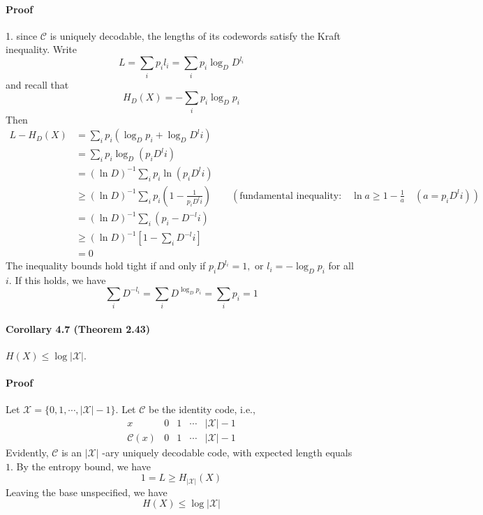 \documentclass[8pt]{article}
\begin{document}
\paragraph{Proof}
1. since $\mathcal{C}$ is uniquely decodable, the lengths of its codewords satisfy the Kraft inequality. Write
$$
L=\sum_{i} p_{i} l_{i}=\sum_{i} p_{i} \log _{D} D^{l_{i}}
$$
and recall that
$$
H_{D}(X)=-\sum_{i} p_{i} \log _{D} p_{i}
$$
Then 
$$
\begin{aligned}
L-H_{D}(X) &=\sum_{i} p_{i}\left(\log _{D} p_{i}+\log _{D} D^{l} i\right) \\
&=\sum_{i} p_{i} \log _{D}\left(p_{i} D^{l} i\right) \\
&=(\ln D)^{-1} \sum_{i} p_{i} \ln \left(p_{i} D^{l} i\right) \\
& \geq(\ln D)^{-1} \sum_{i} p_{i}\left(1-\frac{1}{p_{i} D^{l} i}\right) \qquad (\text{fundamental inequality:}  \quad \ln a \geq 1-\frac{1}{a} \quad\left(a=p_{i} D^{l} i\right))\\
&=(\ln D)^{-1} \sum_{i}\left(p_{i}-D^{-l} i\right) \\
&\geq(\ln D)^{-1}\left[1-\sum_{i} D^{-l} i\right] \\
&=0
\end{aligned}
$$
The inequality bounds hold tight if and only if $p_{i} D^{l_{i}}=1, \text { or } l_{i}=-\log _{D} p_{i}$ for all $i$. If this holds, we have
$$
\sum_{i} D^{-l_{i}}=\sum_{i} D^{\log _{D} p_{i}}=\sum_{i} p_{i}=1
$$

\begin{tcolorbox}
\paragraph{Corollary 4.7 (Theorem 2.43)} $H(X) \leq \log |\mathcal{X}|$.
\end{tcolorbox}
\paragraph{Proof} Let $\mathcal{X}=\{0,1, \cdots,|\mathcal{X}|-1\}$. Let $\mathcal{C}$ be the identity code, i.e.,
$$
\begin{array}{c|cccc|c}
x & 0 & 1 & \cdots & |\mathcal{X}|-1 \\
\hline \mathcal{C}(x) & 0 & 1 & \cdots & |\mathcal{X}|-1
\end{array}
$$
Evidently, $\mathcal{C}$ is an $|\mathcal{X}|$ -ary uniquely decodable code, with expected length equals $1 .$
By the entropy bound, we have
$$
1=L \geq H_{|\mathcal{X}|}(X)
$$
Leaving the base unspecified, we have
$$
H(X) \leq \log |\mathcal{X}|
$$
\end{document}
